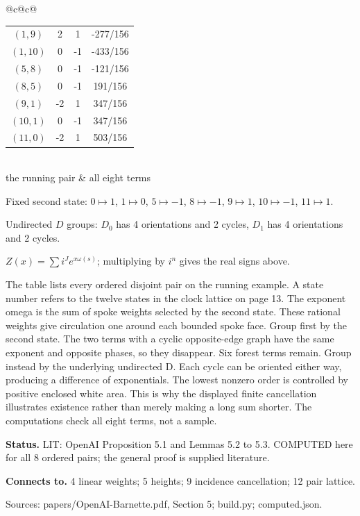 \begin{center}
\begin{minipage}{.86\textwidth}
\begin{tabular}{@{}c@{\hspace{7mm}}c@{}}
\begin{tabular}{cccc}
$(1,9)$ & 2 & 1 & -277/156\\
$(1,10)$ & 0 & -1 & -433/156\\
$(5,8)$ & 0 & -1 & -121/156\\
$(8,5)$ & 0 & -1 & 191/156\\
$(9,1)$ & -2 & 1 & 347/156\\
$(10,1)$ & 0 & -1 & 347/156\\
$(11,0)$ & -2 & 1 & 503/156\\
\hline\end{tabular}\\[0.5mm]
\footnotesize the running pair & \footnotesize all eight terms
\end{tabular}\par\medskip Fixed second state: $0\mapsto 1$, $1\mapsto 0$, $5\mapsto -1$, $8\mapsto -1$, $9\mapsto 1$, $10\mapsto -1$, $11\mapsto 1$.\par Undirected $D$ groups: $D_0$ has 4 orientations and 2 cycles, $D_1$ has 4 orientations and 2 cycles.\par $Z(x)=\sum i^J e^{x\omega(s)}$; multiplying by $i^n$ gives the real signs above.
\end{minipage}\end{center}
The table lists every ordered disjoint pair on the running example. A state number refers to the twelve states in the clock lattice on page 13. The exponent omega is the sum of spoke weights selected by the second state. These rational weights give circulation one around each bounded spoke face. Group first by the second state. The two terms with a cyclic opposite-edge graph have the same exponent and opposite phases, so they disappear. Six forest terms remain. Group instead by the underlying undirected D. Each cycle can be oriented either way, producing a difference of exponentials. The lowest nonzero order is controlled by positive enclosed white area. This is why the displayed finite cancellation illustrates existence rather than merely making a long sum shorter. The computations check all eight terms, not a sample.

\textbf{Status.} LIT: OpenAI Proposition 5.1 and Lemmas 5.2 to 5.3. COMPUTED here for all 8 ordered pairs; the general proof is supplied literature.

\textbf{Connects to.} 4 linear weights; 5 heights; 9 incidence cancellation; 12 pair lattice.

{\footnotesize\raggedright Sources: papers/\allowbreak{}OpenAI-Barnette.pdf, Section 5;\allowbreak{} build.py;\allowbreak{} computed.json.\par}
